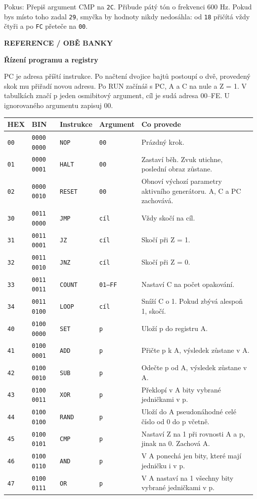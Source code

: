\documentclass[11pt,a4paper]{article}
\newcommand{\tagline}[1]{{\sffamily\bfseries\color{accent}\small #1}\par}
\newcommand{\titleline}[1]{{\sffamily\bfseries\fontsize{25}{29}\selectfont #1\par}\vspace{2mm}}
\newcommand{\note}[1]{\par\vspace{2mm}\noindent\colorbox{pale}{\parbox{.96\linewidth}{\raggedright #1}}\par}
\begin{document}
\note{Pokus: Přepiš argument CMP na \texttt{2C}. Přibude pátý tón o frekvenci 600 Hz. Pokud bys místo toho zadal \texttt{29}, smyčka by hodnoty nikdy nedosáhla: od \texttt{18} přičítá vždy čtyři a po \texttt{FC} přeteče na \texttt{00}.}
\clearpage
\tagline{REFERENCE  /  OBĚ BANKY}
\titleline{Řízení programu a registry}
PC je adresa příští instrukce. Po načtení dvojice bajtů postoupí o dvě, provedený skok mu přiřadí novou adresu. Po RUN začínáš s PC, A a C na nule a Z = 1. V tabulkách značí p jeden osmibitový argument, cíl je sudá adresa 00--FE. U ignorovaného argumentu zapisuj 00.

{\small\begin{tabularx}{\linewidth}{@{}llllX@{}}\toprule
\textbf{HEX} & \textbf{BIN} & \textbf{Instrukce} & \textbf{Argument} & \textbf{Co provede}\\\midrule
\texttt{00} & \texttt{0000 0000} & \texttt{NOP} & \texttt{00} & Prázdný krok.\\
\texttt{01} & \texttt{0000 0001} & \texttt{HALT} & \texttt{00} & Zastaví běh. Zvuk utichne, poslední obraz zůstane.\\
\texttt{02} & \texttt{0000 0010} & \texttt{RESET} & \texttt{00} & Obnoví výchozí parametry aktivního generátoru. A, C a PC zachovává.\\
\texttt{30} & \texttt{0011 0000} & \texttt{JMP} & \texttt{cíl} & Vždy skočí na cíl.\\
\texttt{31} & \texttt{0011 0001} & \texttt{JZ} & \texttt{cíl} & Skočí při Z = 1.\\
\texttt{32} & \texttt{0011 0010} & \texttt{JNZ} & \texttt{cíl} & Skočí při Z = 0.\\
\texttt{33} & \texttt{0011 0011} & \texttt{COUNT} & \texttt{01--FF} & Nastaví C na počet opakování.\\
\texttt{34} & \texttt{0011 0100} & \texttt{LOOP} & \texttt{cíl} & Sníží C o 1. Pokud zbývá alespoň 1, skočí.\\
\texttt{40} & \texttt{0100 0000} & \texttt{SET} & \texttt{p} & Uloží p do registru A.\\
\texttt{41} & \texttt{0100 0001} & \texttt{ADD} & \texttt{p} & Přičte p k A, výsledek zůstane v A.\\
\texttt{42} & \texttt{0100 0010} & \texttt{SUB} & \texttt{p} & Odečte p od A, výsledek zůstane v A.\\
\texttt{43} & \texttt{0100 0011} & \texttt{XOR} & \texttt{p} & Překlopí v A bity vybrané jedničkami v p.\\
\texttt{44} & \texttt{0100 0100} & \texttt{RAND} & \texttt{p} & Uloží do A pseudonáhodné celé číslo od 0 do p včetně.\\
\texttt{45} & \texttt{0100 0101} & \texttt{CMP} & \texttt{p} & Nastaví Z na 1 při rovnosti A a p, jinak na 0. Zachová A.\\
\texttt{46} & \texttt{0100 0110} & \texttt{AND} & \texttt{p} & V A ponechá jen bity, které mají jedničku i v p.\\
\texttt{47} & \texttt{0100 0111} & \texttt{OR} & \texttt{p} & V A nastaví na 1 všechny bity vybrané jedničkami v p.\\
\bottomrule\end{tabularx}}\par
\end{document}
